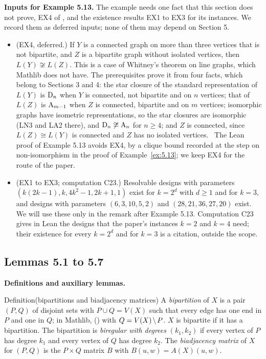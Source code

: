 \begingroup\raggedright
\medskip\noindent\textbf{Inputs for Example 5.13.}\label{input:ex513}
The example needs one fact that this section does not prove, EX4 of
, and the existence results EX1 to EX3 for its instances. We record
them as deferred inputs; none of them may depend on Section 5.
\begin{itemize}
 \item (EX4, deferred.) If $Y$ is a connected graph on more than three vertices that is not
  bipartite, and $Z$ is a bipartite graph without isolated vertices, then $L(Y)\not\cong L(Z)$.
  This is a case of Whitney's theorem on line graphs, which Mathlib does not have. The
  prerequisites prove it from four facts, which belong to Sections 3 and 4: the star closure of
  the standard representation of $L(Y)$ is $\mathrm{D}_n$ when $Y$ is connected, not bipartite and on
  $n$ vertices; that of $L(Z)$ is $\mathrm{A}_{m-1}$ when $Z$ is connected, bipartite and on $m$
  vertices; isomorphic graphs have isometric representations, so the star closures are
  isomorphic (LN3 and LA2 there), and $\mathrm{D}_n\not\cong\mathrm{A}_n$ for $n\ge4$; and $Z$ is
  connected, since $L(Z)\cong L(Y)$ is connected and $Z$ has no isolated vertices. \new\ The
  Lean proof of Example 5.13 avoids EX4, by a clique bound recorded at the step
  on non-isomorphism in the proof of Example~\ref{ex:5.13}; we keep EX4 for the route of the paper.
 \item (EX1 to EX3; computation C23.) Resolvable designs with parameters
  $(k(2k-1),k,4k^2-1,2k+1,1)$ exist for $k=2^d$ with $d\ge1$ and for $k=3$, and designs with
  parameters $(6,3,10,5,2)$ and $(28,21,36,27,20)$ exist. We will use these only in the remark after
  Example 5.13. Computation C23 gives in Lean the designs that the paper's instances $k=2$ and $k=4$
  need; their existence for every $k=2^d$ and for $k=3$ is a citation, outside the scope.
\end{itemize}
\endgroup

\subsection{Lemmas 5.1 to 5.7}

\medskip\noindent\textbf{Definitions and auxiliary lemmas.}

\begin{namedresult}{Definition}{(bipartitions and biadjacency matrices)}\label{def:bipartition}
 \uses{}
 A \emph{bipartition} of $X$ is a pair $(P,Q)$ of disjoint sets with $P\cup Q=V(X)$ such that
 every edge has one end in $P$ and one in $Q$; in Mathlib, 
 () with $Q=V(X)\mathbin{\mkern-1.5mu\setminus\mkern-1.5mu} P$. $X$ is bipartite if it has a bipartition. The bipartition is \emph{biregular
 with degrees} $(k_1,k_2)$ if every vertex of $P$ has degree $k_1$ and every vertex of $Q$ has
 degree $k_2$. The \emph{biadjacency matrix} of $X$ for $(P,Q)$ is the $P\times Q$ matrix $B$
 with $B(u,w)=A(X)(u,w)$.
\end{namedresult}

